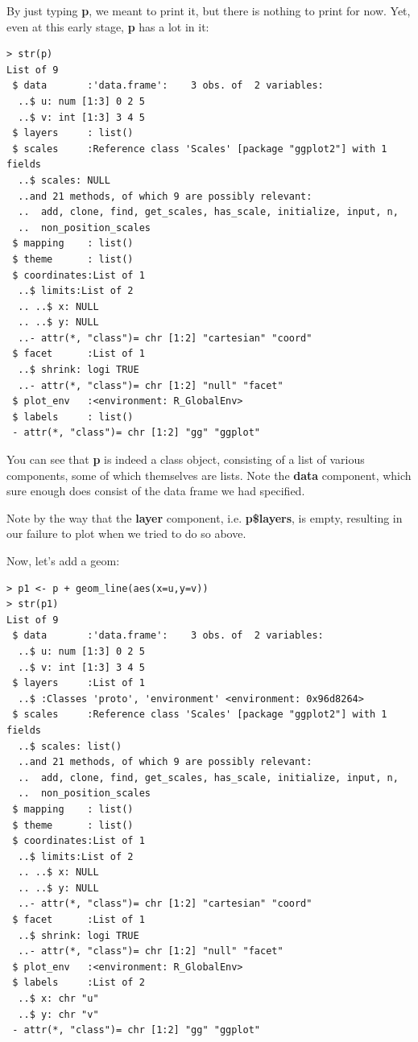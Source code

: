By just typing {\bf p}, we meant to print it, but there is nothing to
print for now.  Yet, even at this early stage, {\bf p} has a lot in it:

\begin{lstlisting}
> str(p)
List of 9
 $ data       :'data.frame':	3 obs. of  2 variables:
  ..$ u: num [1:3] 0 2 5
  ..$ v: int [1:3] 3 4 5
 $ layers     : list()
 $ scales     :Reference class 'Scales' [package "ggplot2"] with 1 fields
  ..$ scales: NULL
  ..and 21 methods, of which 9 are possibly relevant:
  ..  add, clone, find, get_scales, has_scale, initialize, input, n,
  ..  non_position_scales
 $ mapping    : list()
 $ theme      : list()
 $ coordinates:List of 1
  ..$ limits:List of 2
  .. ..$ x: NULL
  .. ..$ y: NULL
  ..- attr(*, "class")= chr [1:2] "cartesian" "coord"
 $ facet      :List of 1
  ..$ shrink: logi TRUE
  ..- attr(*, "class")= chr [1:2] "null" "facet"
 $ plot_env   :<environment: R_GlobalEnv> 
 $ labels     : list()
 - attr(*, "class")= chr [1:2] "gg" "ggplot"
\end{lstlisting}

You can see that {\bf p} is indeed a class object, consisting of a list
of various components, some of which themselves are lists.  Note the
{\bf data} component, which sure enough does consist of the data frame
we had specified.

Note by the way that the {\bf layer} component, i.e. {\bf p\$layers}, is
empty, resulting in our failure to plot when we tried to do so above.

Now, let's add a geom:

\begin{lstlisting}
> p1 <- p + geom_line(aes(x=u,y=v))
> str(p1)
List of 9
 $ data       :'data.frame':	3 obs. of  2 variables:
  ..$ u: num [1:3] 0 2 5
  ..$ v: int [1:3] 3 4 5
 $ layers     :List of 1
  ..$ :Classes 'proto', 'environment' <environment: 0x96d8264> 
 $ scales     :Reference class 'Scales' [package "ggplot2"] with 1 fields
  ..$ scales: list()
  ..and 21 methods, of which 9 are possibly relevant:
  ..  add, clone, find, get_scales, has_scale, initialize, input, n,
  ..  non_position_scales
 $ mapping    : list()
 $ theme      : list()
 $ coordinates:List of 1
  ..$ limits:List of 2
  .. ..$ x: NULL
  .. ..$ y: NULL
  ..- attr(*, "class")= chr [1:2] "cartesian" "coord"
 $ facet      :List of 1
  ..$ shrink: logi TRUE
  ..- attr(*, "class")= chr [1:2] "null" "facet"
 $ plot_env   :<environment: R_GlobalEnv> 
 $ labels     :List of 2
  ..$ x: chr "u"
  ..$ y: chr "v"
 - attr(*, "class")= chr [1:2] "gg" "ggplot"
\end{lstlisting}


